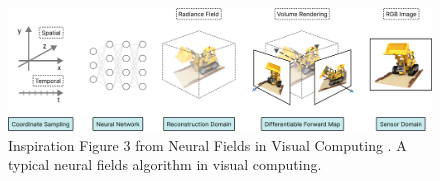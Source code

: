 \begin{figure}[!h]
    \centering
    \includegraphics[width=1.0\textwidth]{figures/neural-field.png}
    \caption{Inspiration Figure 3 from Neural Fields in Visual Computing \cite{xie_neural_2022}. A typical neural fields algorithm in visual computing.}
    \label{fig:neural-field}
\end{figure}